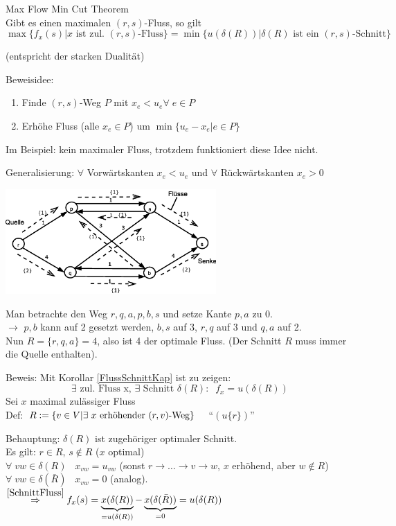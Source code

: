 \begin{satz}\label{MaxFlowMinCut}
Max Flow Min Cut Theorem\\
Gibt es einen maximalen $(r,s)$-Fluss, so gilt
\[\max\{f_{x}(s) | x \mbox{ ist zul. $(r,s)$-Fluss}\} = 
\min \{u(\delta(R))| \delta (R) \mbox{ ist ein $(r,s)$-Schnitt}\}\]
\end{satz}
(entspricht der starken Dualität)

Beweisidee:
\begin{enumerate}
\item Finde $(r,s)$-Weg $P$ mit $x_{e} < u_{e} \forall \; e \in P$
\item Erhöhe Fluss (alle $x_{e} \in P$) um $\min\{u_{e} - x_{e} | e \in
P\}$
\end{enumerate}
Im Beispiel: kein maximaler Fluss, trotzdem funktioniert diese Idee nicht.

Generalisierung: $\forall$ Vorwärtskanten $x_{e} < u_{e}$ und $\forall$
Rückwärtskanten $x_{e} > 0$ 

\includegraphics[height=4cm]{bilder/3-0Maxfluss}

Man betrachte den Weg $r,q,a,p,b,s$ und setze Kante $p,a$ zu 0.\\
$\rightarrow$ $p,b$ kann auf 2 gesetzt werden, $b,s$ auf 3, $r,q$ auf 3 und
$q,a$ auf 2.\\
Nun $R=\{r,q,a\}=4$, also ist 4 der optimale Fluss. (Der Schnitt $R$ muss
immer die Quelle enthalten).

Beweis: Mit Korollar \ref{FlussSchnittKap} ist zu zeigen:
\[\exists \mbox{ zul. Fluss x, } \exists \mbox{ Schnitt } \delta(R): \; \;
f_{x} = u (\delta(R))\]
Sei $x$ maximal zulässiger Fluss\\
Def: $R:= \{ v \in V| \exists \mbox{ $x$ erhöhender $(r,v)$-Weg} \}
\hspace{3mm}$ "`$(u\{r\})$"'

Behauptung: $\delta(R)$ ist zugehöriger optimaler Schnitt.\\
Es gilt: $r \in R$, $s \not\in R$ ($x$ optimal)\\
$\forall\;v w \in \delta(R) \; \; \; x_{v w} = u_{v w}$ (sonst
$r\rightarrow\ldots\rightarrow v \rightarrow w$, $x$ erhöhend, aber $w \not\in
R$)\\
$\forall \; v w \in  \delta(\bar{R}) \; \; \; x_{v w} = 0$ (analog).
$\stackrel{\ref{SchnittFluss}}{\Rightarrow} f_{x}(s) = \underbrace{ x
(\delta(R))}_{= u(\delta(R))} -  \underbrace{x (\delta (\bar{R}))}_{=0} =
u(\delta(R))$


